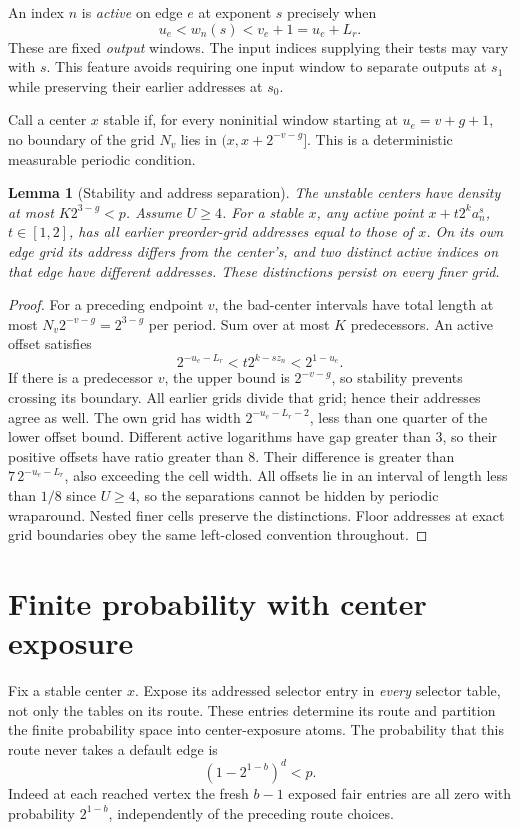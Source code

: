 \documentclass[11pt]{article}
\newtheorem{lemma}[theorem]{Lemma}
\theoremstyle{definition}
\theoremstyle{remark}
\begin{document}
An index $n$ is \emph{active} on edge $e$ at exponent $s$ precisely when
\begin{equation}\label{eq:activation}
 u_e<w_n(s)<v_e+1=u_e+L_r.
\end{equation}
These are fixed \emph{output} windows. The input indices supplying their tests
may vary with $s$. This feature avoids requiring one input window to separate
outputs at $s_1$ while preserving their earlier addresses at $s_0$.

Call a center $x$ stable if, for every noninitial window starting at
$u_e=v+g+1$, no boundary of the grid $N_v$ lies in
$(x,x+2^{-v-g}]$. This is a deterministic measurable periodic condition.

\begin{lemma}[Stability and address separation]\label{lem:geometry}
The unstable centers have density at most $K2^{3-g}<p$. Assume $U\geq4$.
For a stable $x$, any active point
$x+t2^ka_n^s$, $t\in[1,2]$, has all earlier preorder-grid addresses equal to
those of $x$. On its own edge grid its address differs from the center's,
and two distinct active indices on that edge have different addresses.
These distinctions persist on every finer grid.
\end{lemma}
\begin{proof}
For a preceding endpoint $v$, the bad-center intervals have total length at
most $N_v2^{-v-g}=2^{3-g}$ per period. Sum over at most $K$ predecessors.
An active offset satisfies
\begin{equation}\label{eq:offsetbounds}
 2^{-u_e-L_r}<t2^{k-sz_n}<2^{1-u_e}.
\end{equation}
If there is a predecessor $v$, the upper bound is $2^{-v-g}$, so stability
prevents crossing its boundary. All earlier grids divide that grid; hence their
addresses agree as well. The own grid has width $2^{-u_e-L_r-2}$, less than
one quarter of the lower offset bound. Different active logarithms have gap
greater than $3$, so their positive offsets have ratio greater than $8$.
Their difference is greater than $7\,2^{-u_e-L_r}$, also exceeding the cell
width. All offsets lie in an interval of length less than $1/8$ since $U\geq4$,
so the separations cannot be hidden by periodic wraparound. Nested finer cells
preserve the distinctions. Floor addresses at exact grid boundaries obey the
same left-closed convention throughout.
\end{proof}

\section{Finite probability with center exposure}\label{sec:probability}
Fix a stable center $x$. Expose its addressed selector entry in \emph{every}
selector table, not only the tables on its route. These entries determine its
route and partition the finite probability space into center-exposure atoms.
The probability that this route never takes a default edge is
\begin{equation}\label{eq:nodefault}
 (1-2^{1-b})^d<p.
\end{equation}
Indeed at each reached vertex the fresh $b-1$ exposed fair entries are all zero
with probability $2^{1-b}$, independently of the preceding route choices.
\end{document}
